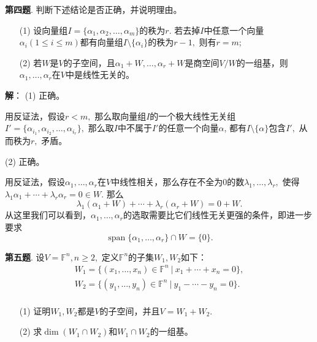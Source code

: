 \fi  %

\newpageorvspace

{\bf 第四题}. 判断下述结论是否正确，并说明理由。
\begin{itemize}
\item[(1)] 设向量组$I = \{ \alpha_1, \alpha_2, \ldots, \alpha_m \}$的秩为$r.$ 若去掉$I$中任意一个向量$\alpha_i (1 \leqslant i \leqslant m)$都有向量组$I \setminus \{ \alpha_i \}$的秩为$r-1,$ 则有$r = m$;
\item[(2)] 若$W$是$V$的子空间，且$\alpha_1 + W, \ldots, \alpha_r + W$是商空间$V / W$的一组基，则$\alpha_1, \ldots, \alpha_r$在$V$中是线性无关的。
\end{itemize}

\ifIncludeAnswer

\newpageorvspace

{\bf 解}： (1) 正确。

用反证法，假设$r < m,$ 那么取向量组$I$的一个极大线性无关组$I' = \{ \alpha_{i_1}, \alpha_{i_2}, \ldots, \alpha_{i_r} \},$ 那么取$I$中不属于$I'$的任意一个向量$\alpha$, 都有$I \setminus \{ \alpha \}$包含$I',$ 从而秩为$r,$ 矛盾。

(2) 正确。

用反证法，假设$\alpha_1, \ldots, \alpha_r$在$V$中线性相关，那么存在不全为0的数$\lambda_1, \ldots, \lambda_r,$ 使得$\lambda_1 \alpha_1 + \cdots + \lambda_r \alpha_r = 0 \in W.$ 那么
$$\lambda_1 (\alpha_1 + W) + \cdots + \lambda_r (\alpha_r + W) = 0 + W.$$
从这里我们可以看到，$\alpha_1, \ldots, \alpha_r$的选取需要比它们线性无关更强的条件，即进一步要求
$$\operatorname{span}\{ \alpha_1, \ldots, \alpha_r \} \cap W = \{0\}.$$

\fi  %

\newpageorvspace

{\bf 第五题}. 设$V = \mathbb{F}^n, n \geqslant 2,$ 定义$\mathbb{F}^n$的子集$W_1, W_2$如下：
\begin{gather*}
W_1 = \{ (x_1, \ldots, x_n) \in \mathbb{F}^n \ |\ x_1 + \cdots + x_n = 0 \}, \\
W_2 = \{ (y_1, \ldots, y_n) \in \mathbb{F}^n \ |\ y_1 - \cdots - y_n = 0 \}. \\
\end{gather*}
\begin{itemize}
\item[(1)] 证明$W_1, W_2$都是$V$的子空间，并且$V = W_1 + W_2$.
\item[(2)] 求$\dim (W_1 \cap W_2)$和$W_1 \cap W_2$的一组基。
\end{itemize}

